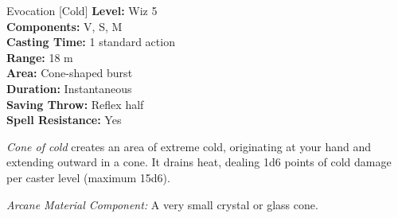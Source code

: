 {Evocation [Cold]}
{
	\textbf{Level:}
	Wiz 5\\
	\textbf{Components:}
	V, S, M\\
	\textbf{Casting Time:}
	1 standard action\\
	\textbf{Range:}
	18 m\\
	\textbf{Area:}
	Cone-shaped burst\\
	\textbf{Duration:}
	Instantaneous\\
	\textbf{Saving Throw:}
	Reflex half\\
	\textbf{Spell Resistance:}
	Yes\\
}
{
	\emph{Cone of cold} creates an area of extreme cold, originating at your hand and extending outward in a cone. It drains heat, dealing 1d6 points of cold damage per caster level (maximum 15d6).

	\textit{Arcane Material Component:}
	A very small crystal or glass cone.

}
